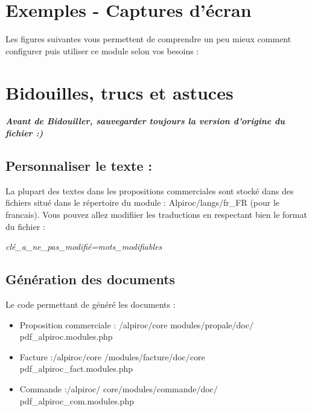 \documentclass[a4paper,11pt]{article}
\begin{document}
\section{Exemples - Captures d'écran}
Les figures suivantes vous permettent de comprendre un peu mieux comment configurer puis utiliser ce module selon vos besoins :






\section{Bidouilles, trucs et astuces}

\textit{\textbf{Avant de Bidouiller, sauvegarder toujours la version d'origine du fichier :)}}\\

\subsection{Personnaliser le texte :}
La plupart des textes dans les propositions commerciales sont stocké dans des fichiers situé dans le répertoire du module : Alpiroc$\slash$langs$\slash$fr\_FR (pour le francais). Vous pouvez allez modifiier les traductions en respectant bien le format du fichier : \\
\begin{center}
\textit{clé\_a\_ne\_pas\_modifié=mots\_modifiables}
\end{center}

\subsection{Génération des documents}
Le code permettant de généré les documents :\\
\begin{itemize}
  \item Proposition commerciale : $\slash$alpiroc$\slash$core modules$\slash$propale$\slash$doc$\slash$pdf\_alpiroc.modules.php
  \item Facture :$\slash$alpiroc$\slash$core $\slash$modules$\slash$facture$\slash$doc$\slash$core pdf\_alpiroc\_fact.modules.php
  \item Commande :$\slash$alpiroc$\slash$ core$\slash$modules$\slash$commande$\slash$doc$\slash$pdf\_alpiroc\_com.modules.php
\end{itemize}
\end{document}
